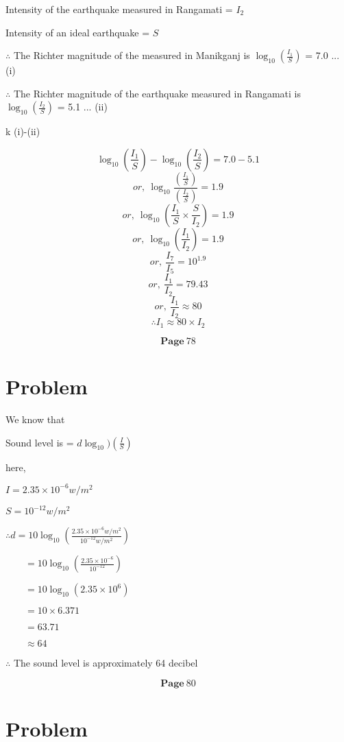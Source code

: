 \documentclass{report}
\begin{document}
Intensity of the earthquake measured in Rangamati = $I_2$ 

Intensity of an ideal earthquake = $S$

\hspace{30cm}

$\therefore$ The Richter magnitude of the measured in Manikganj is $\log_{10}\left(\frac{I_1}{S}\right)$ = 7.0 ... (i)

$\therefore$ The Richter magnitude of the earthquake measured in Rangamati is $\log_{10}\left(\frac{I_2}{S}\right)$ = 5.1 ... (ii)

\hspace{30cm}
k (i)-(ii)

$$\log_{10}\left(\frac{I_1}{S}\right) - \log_{10}\left(\frac{I_2}{S}\right) = 7.0-5.1$$
$$or,\: \log_{10} \frac{\left(\frac{I_1}{S}\right)}{\left(\frac{I_2}{S}\right)} = 1.9$$
$$or,\: \log_{10}\left(\frac{I_1}{S}\times\frac{S}{I_2}\right) = 1.9 $$
$$or,\: \log_{10}\left(\frac{I_1}{I_2}\right) = 1.9$$
$$or,\: \frac{I_7}{I_5} = 10^{1.9}$$
$$or,\: \frac{I_1}{I_2} = 79.43$$
$$or,\: \frac{I_1}{I_2} \approx 80$$
$$\therefore I_1 \approx 80 \times I_2$$

$$\textbf{Page} \: 78$$

\section{Problem}
We know that 

Sound level is = $d\log_{10})\left(\frac{I}{S}\right)$

here,

$I = 2.35\times10^{-6} w/m^{2}$

$S = 10^{-12} w/m^{2}$

\hspace{30cm}

$\therefore d =10\log_{10}\left(\frac{2.35\times10^{-6}w/m^{2}}{10^{-12}w/m^{2}}\right)$

$\quad\quad =10\log_{10}\left(\frac{2.35\times10^{-6}}{10^{-12}}\right)$

$\quad\quad =10\log_{10} \left(2.35\times10^{6}\right)$

$\quad\quad = 10 \times 6.371$

$\quad\quad = 63.71$

$\quad\quad \approx 64$

$\therefore$ The sound level is approximately 64 decibel

$$\textbf{Page} \: 80$$

\section{Problem}
\end{document}
